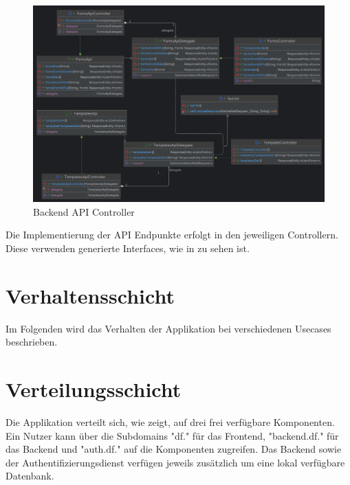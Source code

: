 \begin{figure}[H]
    \centering
    \includegraphics[width=15cm]{images/classDiagrams/Api}
    \caption{Backend API Controller}\label{fig:Backend-API-Controller}
\end{figure}

Die Implementierung der \ac{API} Endpunkte erfolgt in den jeweiligen Controllern.
Diese verwenden generierte Interfaces, wie in  zu sehen ist.


\section{Verhaltensschicht}\label{sec:verhaltensschicht}
Im Folgenden wird das Verhalten der Applikation bei verschiedenen Usecases beschrieben.

\newpage
\section{Verteilungsschicht}\label{sec:verteilungsschicht}
Die Applikation verteilt sich, wie  zeigt, auf drei frei verfügbare Komponenten.
Ein Nutzer kann über die Subdomains "df." für das Frontend, "backend.df." für das Backend und "auth.df."
auf die Komponenten zugreifen.
Das Backend sowie der Authentifizierungsdienst verfügen jeweils zusätzlich um eine lokal verfügbare Datenbank.

